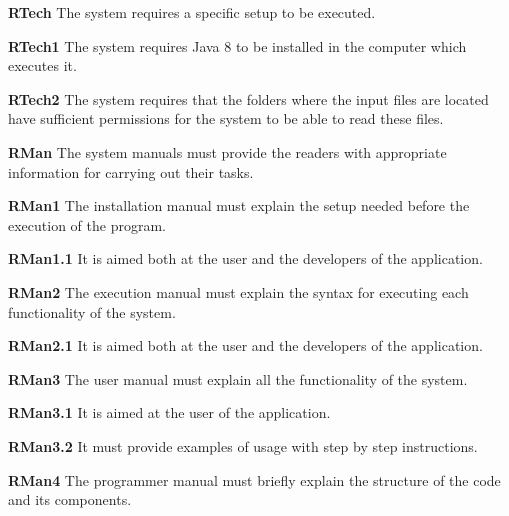 \begin{description}

    \item \textbf{RTech} The system requires a specific setup to be executed.
        \begin{description}
            \item \textbf{RTech1} The system requires Java 8 to be installed in the computer which executes it.
            \item \textbf{RTech2} The system requires that the folders where the input files are located have sufficient permissions for the system to be able to read these files.
        \end{description}

    \item \textbf{RMan} The system manuals must provide the readers with appropriate information for carrying out their tasks.  
        \begin{description}
            \item \textbf{RMan1} The installation manual must explain the setup needed before the execution of the program.
                \begin{description}
                    \item \textbf{RMan1.1} It is aimed both at the user and the developers of the application.
                \end{description}
            \item \textbf{RMan2} The execution manual must explain the syntax for executing each functionality of the system.
                \begin{description}
                    \item \textbf{RMan2.1} It is aimed both at the user and the developers of the application.
                \end{description}
            \item \textbf{RMan3} The user manual must explain all the functionality of the system.
                \begin{description}
                    \item \textbf{RMan3.1} It is aimed at the user of the application.
                    \item \textbf{RMan3.2} It must provide examples of usage with step by step instructions. 
                \end{description}
            \item \textbf{RMan4} The programmer manual must briefly explain the structure of the code and its components.

\end{description}
\end{description}
